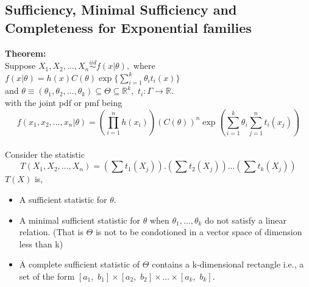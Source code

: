 \documentclass[12pt,a4paper]{article}
\begin{document}
\subsection{Sufficiency, Minimal Sufficiency and Completeness for Exponential families}
\textbf{Theorem:}\\
Suppose $X_1,X_2,\dots,X_n \overset{iid}{\sim} f(x|\theta),$ where $f(x|\theta)=h(x)C(\theta)\exp\{\sum \limits_{i=1}^k\theta_i t_i(x)\}$\\
and $\theta\equiv(\theta_1,\theta_2,\dots,\theta_k)\subseteq\Theta\subseteq\mathbb{R}^k, \,\, t_i:\Gamma\rightarrow\mathbb{R}.$\\
with the joint pdf or pmf being $$f(x_1,x_2,\dots,x_n|\theta)=\left(\prod\limits_{i=1}^n h(x_i)\right) \left(C(\theta)\right)^n \exp\left(\sum\limits_{i=1}^k \theta_i \sum\limits_{j=1}^n t_i(x_j) \right)$$\\
Consider the statistic $$T(X_1,X_2,\dots,X_n)= \left(\sum t_1(X_j)\right).\left(\sum t_2(X_j)\right)\dots \left(\sum t_k(X_j)\right)$$
$T(X)$ is,
\begin{itemize}
\item A sufficient statistic for  $\theta.$
\item A minimal sufficient statistic for $\theta$ when $\theta_1,\dots,\theta_k$ do not satisfy a linear relation. (That is $\Theta$ is not to be condotioned in a vector space of dimension less than k)
\item A complete sufficient statistic of $\Theta$ contains a k-dimensional rectangle i.e., a set of the form $[a_1,\,\, b_1]\times[a_2, \,\, b_2]\times\dots\times[a_k, \,\, b_k].$
\end{itemize}
\end{document}
